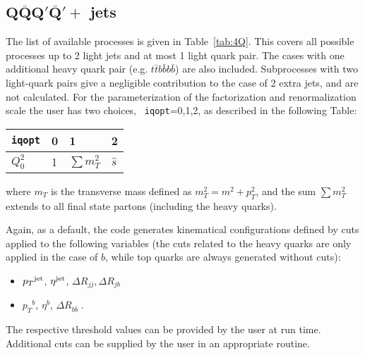 \documentclass[paper]{JHEP3}
\def    \bbar   {\bar{b}}
\def    \tbar   {\bar{t}}
\def    \Qbar   {\overline{Q}}
\def    \pt             {\mbox{$p_T$}}
\def    \ptsq           {\mbox{$p^2_T$}}
\def    \mT             {\mbox{$m_T$}}
\def    \mTsq           {\mbox{$m^2_T$}}
\begin{document}
\subsection{$\mathbf{ Q\Qbar Q'\Qbar'+}$ jets}
\label{sec:4Q}
The list of available processes is given in Table~\ref{tab:4Q}. This
covers all possible processes up to 2 light jets and at most 1 light
quark pair.  The cases with one additional heavy quark pair (e.g.
$t\tbar b\bbar b\bbar$) are also included. Subprocesses with two
light-quark pairs give a negligible contribution to the case of 2
extra jets, and are not calculated.  For the parameterization of the
factorization and renormalization scale the user has two choices, {\tt
  iqopt}=0,1,2, as described in the following Table:
{\renewcommand{\arraystretch}{1.2}
\begin{center}
\begin{tabular}{l||l|l|l}
{\tt iqopt} & 0 & 1 & 2 \\ \hline
$Q_0^2$ & 1 & $\sum \mTsq$ & $\hat{s}$ \\
\end{tabular}
\end{center}}
where $\mT$ is the transverse mass defined as $\mTsq=m^2+\ptsq$,
and the sum $\sum \mTsq $ extends to all final
state partons (including the heavy quarks).

Again, as a default, the code generates kinematical configurations defined by
cuts applied to the following variables (the cuts related to the heavy
quarks are only applied in the case of $b$, while top quarks are
always generated without cuts):
\begin{itemize}
\item $\pt^{\rm jet}$, $\eta^{\rm jet}$, $\Delta R_{jj}, \Delta R_{jb}$
\item $\pt^{ b}$, $\eta^{ b}$, $\Delta R_{b\bbar} \; .$
\end{itemize}
The respective threshold values can be provided by the user at run
time. Additional cuts can be supplied by the user in an appropriate
routine. 
\end{document}
